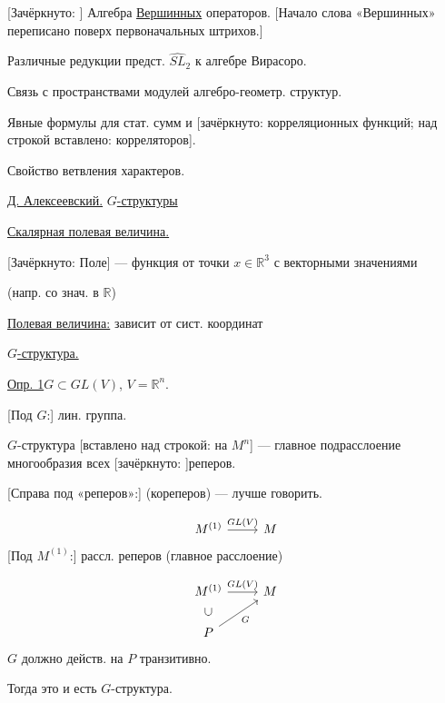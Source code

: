 [Зачёркнуто: ]
Алгебра \underline{Вершинных} операторов.
[Начало слова «Вершинных» переписано поверх первоначальных штрихов.]

Различные редукции предст. $\widehat{SL}_2$ к алгебре Вирасоро.

Связь с пространствами модулей алгебро-геометр. структур.

Явные формулы для стат. сумм и
[зачёркнуто: корреляционных функций; над строкой вставлено: корреляторов].

Свойство ветвления характеров.


\underline{Д. Алексеевский.} \qquad \underline{$G$-структуры}

\underline{Скалярная полевая величина.}

[Зачёркнуто: Поле] — функция от точки $x\in\mathbb{R}^3$ с векторными значениями

(напр. со знач. в $\mathbb{R}$)

\underline{Полевая величина:} зависит от сист. координат

\underline{$G$-структура.}

\underline{Опр. 1}\quad $G\subset GL(V)$, $V=\mathbb{R}^n$.

[Под $G$:] лин. группа.

$G$-структура [вставлено над строкой: на $M^n$] — главное подрасслоение многообразия всех
[зачёркнуто: ]реперов.

[Справа под «реперов»:] (кореперов) — лучше говорить.

\begin{equation*}
\begin{tikzcd}
M^{(1)} \arrow[r,"GL(V)"] & M
\end{tikzcd}
\end{equation*}
[Под $M^{(1)}$:] рассл. реперов (главное расслоение)

\begin{equation*}
\begin{tikzcd}
M^{(1)} \arrow[r,"GL(V)"] & M \\
P \arrow[u,phantom,"\cup" description] \arrow[ur,"G"'] &
\end{tikzcd}
\end{equation*}
$G$ должно действ. на $P$ транзитивно.

Тогда это и есть $G$-структура.

